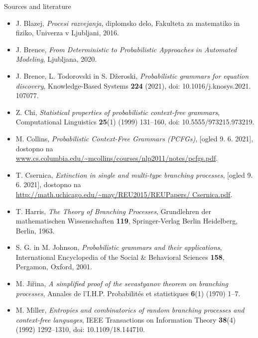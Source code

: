 \documentclass[t,usenames,dvipsnames]{beamer} %
\newcommand{\1}{\boldsymbol{1}}
\newcommand{\0}{\boldsymbol{0}}
\begin{document}
\begin{frame}{Sources and literature}
\begin{itemize}
    \item J. Blazej, \textit{Procesi razvejanja}, diplomsko delo, Fakulteta za matematiko in fiziko, Univerza v Ljubljani, 2016.
    \item J. Brence, \textit{From Deterministic to Probabilistic Approaches in Automated Modeling}, Ljubljana, 2020.
    \item J. Brence, L. Todorovski in S. Džeroski, \textit{Probabilistic grammars for equation discovery}, Knowledge-Based Systems \textbf{224} (2021), doi: 10.1016/j.knosys.2021.  107077.
    \item Z. Chi, \textit{Statistical properties of probabilistic context-free grammars}, Computational Linguistics \textbf{25}(1) (1999) 131–160, doi: 10.5555/973215.973219.
    \item M. Collins, \textit{Probabilistic Context-Free Grammars (PCFGs)}, [ogled 9. 6. 2021], dostopno na \url{www.cs.columbia.edu/~mcollins/courses/nlp2011/notes/pcfgs.pdf}.
\end{itemize}
\end{frame}


\begin{frame}
\begin{itemize}
    \item  T. Csernica, \textit{Extinction in single and multi-type branching processes}, [ogled 9. 6.  2021], dostopno na \url{http://math.uchicago.edu/~may/REU2015/REUPapers/ Csernica.pdf}.
    \item T. Harris, \textit{The Theory of Branching Processes}, Grundlehren der mathematischen Wissenschaften \textbf{119}, Springer-Verlag Berlin Heidelberg, Berlin, 1963.
    \item S. G. in M. Johnson, \textit{Probabilistic grammars and their applications}, International Encyclopedia of the Social \& Behavioral Sciences \textbf{158}, Pergamon, Oxford, 2001.
    \item M. Jiřina, \textit{A simplified proof of the sevastyanov theorem on branching processes}, Annales de l’I.H.P. Probabilités et statistiques \textbf{6}(1) (1970) 1–7.
    \item M. Miller, \textit{Entropies and combinatorics of random branching processes and context-free languages}, IEEE Transactions on Information Theory \textbf{38}(4) (1992) 1292–1310, doi: 10.1109/18.144710.

\end{itemize}
\end{frame}
\end{document}
